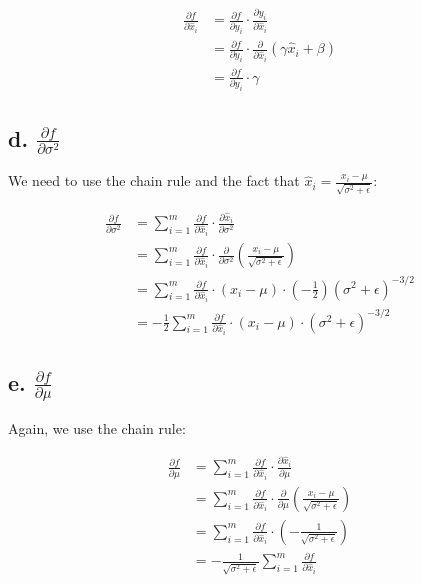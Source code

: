 \begin{align*}
\frac{\partial f}{\partial \hat{x}_i} &= \frac{\partial f}{\partial y_i} \cdot \frac{\partial y_i}{\partial \hat{x}_i} \\
&= \frac{\partial f}{\partial y_i} \cdot \frac{\partial}{\partial \hat{x}_i}(\gamma \hat{x}_i + \beta) \\
&= \frac{\partial f}{\partial y_i} \cdot \gamma
\end{align*}

\subsection*{d. $\frac{\partial f}{\partial \sigma^2}$}

We need to use the chain rule and the fact that $\hat{x}_i = \frac{x_i - \mu}{\sqrt{\sigma^2 + \epsilon}}$:

\begin{align*}
\frac{\partial f}{\partial \sigma^2} &= \sum_{i=1}^m \frac{\partial f}{\partial \hat{x}_i} \cdot \frac{\partial \hat{x}_i}{\partial \sigma^2} \\
&= \sum_{i=1}^m \frac{\partial f}{\partial \hat{x}_i} \cdot \frac{\partial}{\partial \sigma^2}\left(\frac{x_i - \mu}{\sqrt{\sigma^2 + \epsilon}}\right) \\
&= \sum_{i=1}^m \frac{\partial f}{\partial \hat{x}_i} \cdot (x_i - \mu) \cdot (-\frac{1}{2})(\sigma^2 + \epsilon)^{-3/2} \\
&= -\frac{1}{2}\sum_{i=1}^m \frac{\partial f}{\partial \hat{x}_i} \cdot (x_i - \mu) \cdot (\sigma^2 + \epsilon)^{-3/2}
\end{align*}

\subsection*{e. $\frac{\partial f}{\partial \mu}$}

Again, we use the chain rule:

\begin{align*}
\frac{\partial f}{\partial \mu} &= \sum_{i=1}^m \frac{\partial f}{\partial \hat{x}_i} \cdot \frac{\partial \hat{x}_i}{\partial \mu} \\
&= \sum_{i=1}^m \frac{\partial f}{\partial \hat{x}_i} \cdot \frac{\partial}{\partial \mu}\left(\frac{x_i - \mu}{\sqrt{\sigma^2 + \epsilon}}\right) \\
&= \sum_{i=1}^m \frac{\partial f}{\partial \hat{x}_i} \cdot (-\frac{1}{\sqrt{\sigma^2 + \epsilon}}) \\
&= -\frac{1}{\sqrt{\sigma^2 + \epsilon}} \sum_{i=1}^m \frac{\partial f}{\partial \hat{x}_i}
\end{align*}

